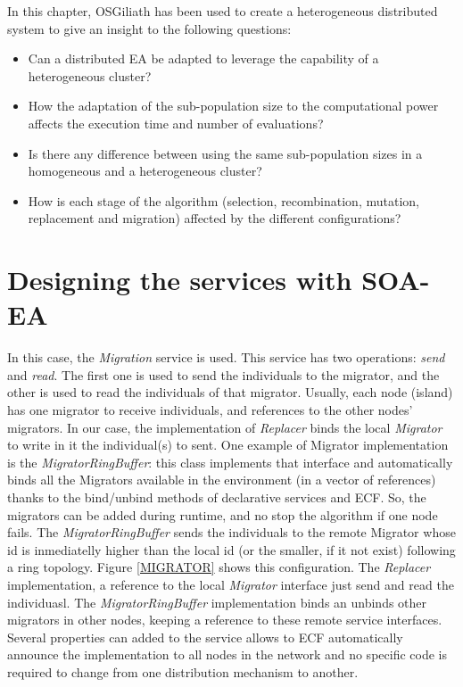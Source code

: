 In this chapter, OSGiliath has been used %
 to create a heterogeneous distributed system to give an insight to the following questions:
\begin{itemize}
 \item Can a distributed EA be adapted to leverage the capability of a
   heterogeneous cluster?  %
 \item How the adaptation of the sub-population size to the
   computational power affects the execution time and number of
   evaluations?  %
 \item Is there any difference between using the same sub-population sizes in a homogeneous and a heterogeneous cluster?
 \item How is each stage of the algorithm (selection, recombination, mutation, replacement and migration) affected by the different
   configurations?  %
\end{itemize}


\section{Designing the services with SOA-EA}

In this case, the {\em Migration} service is used. This service has two operations: {\em send} and {\em read}. The first one is used to send the individuals to the migrator, and the other is used to read the individuals of that migrator. Usually, each node (island) has one migrator to receive individuals, and references to the other nodes' migrators. In our case, the implementation of {\em Replacer} binds the local {\em Migrator} to write in it the individual(s) to sent. One example of Migrator implementation is the {\em MigratorRingBuffer}: this class implements that interface and automatically binds all the Migrators available in the environment (in a vector of references) thanks to the bind/unbind methods of declarative services and ECF. So, the migrators can be added during runtime, and no stop the algorithm if one node fails.  The {\em MigratorRingBuffer} sends the individuals to the remote Migrator whose id is inmediatelly higher than the local id (or the smaller, if it not exist) following a ring topology. Figure \ref{MIGRATOR} shows this configuration. The {\em Replacer} implementation, a reference to the local {\em Migrator} interface just send and read the individuasl. The {\em MigratorRingBuffer} implementation binds an unbinds other migrators in other nodes, keeping a reference to these remote service interfaces. Several properties can added to the service allows to ECF automatically announce the implementation to all nodes in the network and no specific code is required to change from one distribution mechanism to another. 

